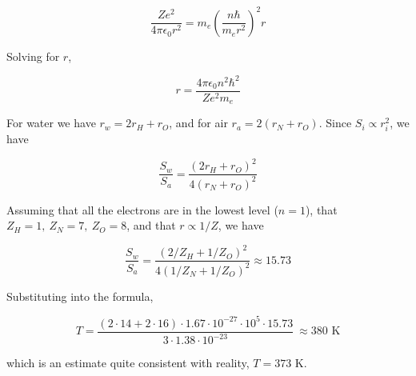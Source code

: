 \documentclass[11pt]{article}
\begin{document}
\begin{pproblem}
\begin{pssolution*}{}{}
\begin{alternativas}
    \[\frac{Ze^2}{4\pi\epsilon_0 r^2} = m_e \left(\frac{n\hbar}{m_er^2}\right)^2 r\]

    Solving for \(r\),

    \[r = \frac{4\pi\epsilon_0 n^2\hbar ^2}{Z e^2 m_e}\]

    \item For water we have \(r_w = 2r_H + r_O\), and for air \(r_a = 2(r_N + r_O)\). Since \(S_i \propto r_i^2\), we have
    
    \[\frac{S_w}{S_a} = \frac{(2r_H + r_O)^2}{4(r_N + r_O)^2}\]

    Assuming that all the electrons are in the lowest level (\(n=1\)), that \(Z_H = 1, \ Z_N = 7, \ Z_O = 8\), and that \(r\propto 1/Z\), we have
    
    \[\boxed{\frac{S_w}{S_a}=\frac{(2/Z_H + 1/Z_O)^2}{4(1/Z_N + 1/Z_O)^2} \approx 15.73}\]

    \item Substituting into the formula,

    \[T = \frac{(2\cdot 14 + 2 \cdot 16) \cdot 1.67 \cdot 10^{-27} \cdot 10^{5} \cdot 15.73}{3 \cdot 1.38\cdot 10^{-23}} \ \boxed{\approx 380\text{ K}}\]

    which is an estimate quite consistent with reality, \(T = 373\) K.
\end{alternativas}
    

    

    
    
\end{pssolution*}
\end{pproblem}
\end{document}
